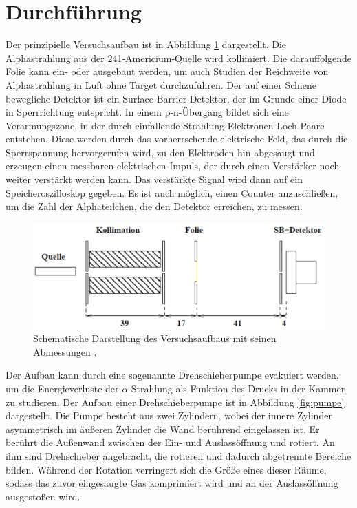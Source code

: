 \section{Durchführung}
\label{sec:Durchführung}

Der prinzipielle Versuchsaufbau ist in Abbildung \ref{fig:aufbau} dargestellt. Die Alphastrahlung aus der 241-Americium-Quelle wird kollimiert. Die darauffolgende Folie kann ein- oder ausgebaut werden, um auch Studien der Reichweite von Alphastrahlung in Luft ohne Target durchzuführen. Der auf einer Schiene bewegliche Detektor ist ein Surface-Barrier-Detektor, der im Grunde einer Diode in Sperrrichtung entspricht.
In einem p-n-Übergang bildet sich eine Verarmungszone, in der durch einfallende Strahlung Elektronen-Loch-Paare entstehen. Diese werden durch das vorherrschende elektrische Feld, das durch die Sperrspannung hervorgerufen wird, zu den Elektroden hin abgesaugt und erzeugen einen messbaren elektrischen Impuls, der durch einen Verstärker noch weiter verstärkt werden kann. Das verstärkte Signal wird dann auf ein Speicheroszilloskop gegeben. Es ist auch möglich, einen Counter anzuschließen, um die Zahl der Alphateilchen, die den Detektor erreichen, zu messen.

\begin{figure}
  \centering
  \includegraphics[width=\textwidth]{images/aufbau.png}
  \caption{Schematische Darstellung des Versuchsaufbaus mit seinen Abmessungen \cite{Versuchsanleitung}.}
  \label{fig:aufbau}
\end{figure}

Der Aufbau kann durch eine sogenannte Drehschieberpumpe evakuiert werden, um die Energieverluste der $\alpha$-Strahlung als Funktion des Drucks in der Kammer zu studieren. Der Aufbau einer Drehschieberpumpe ist in Abbildung \ref{fig:pumpe} dargestellt.
Die Pumpe besteht aus zwei Zylindern, wobei der innere Zylinder asymmetrisch im äußeren Zylinder die Wand berührend eingelassen ist. Er berührt die Außenwand zwischen der Ein- und Auslassöffnung und rotiert. An ihm sind Drehschieber angebracht, die rotieren und dadurch abgetrennte Bereiche bilden. Während der Rotation verringert sich die Größe eines dieser Räume, sodass das zuvor eingesaugte Gas komprimiert wird und an der Auslassöffnung ausgestoßen wird.

